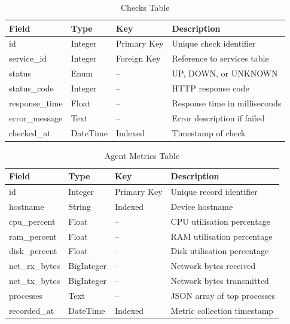 \documentclass[12pt,a4paper,oneside]{report}
\begin{document}
\begin{table}[H]
\centering
\begin{tabularx}{\textwidth}{|l|l|l|X|}
\hline
\textbf{Field} & \textbf{Type} & \textbf{Key} & \textbf{Description} \\
\hline
id & Integer & Primary Key & Unique check identifier \\
service\_id & Integer & Foreign Key & Reference to services table \\
status & Enum & -- & UP, DOWN, or UNKNOWN \\
status\_code & Integer & -- & HTTP response code \\
response\_time & Float & -- & Response time in milliseconds \\
error\_message & Text & -- & Error description if failed \\
checked\_at & DateTime & Indexed & Timestamp of check \\
\hline
\end{tabularx}
\caption{Checks Table}
\label{tab:checks}
\end{table}

\begin{table}[H]
\centering
\begin{tabularx}{\textwidth}{|l|l|l|X|}
\hline
\textbf{Field} & \textbf{Type} & \textbf{Key} & \textbf{Description} \\
\hline
id & Integer & Primary Key & Unique record identifier \\
hostname & String & Indexed & Device hostname \\
cpu\_percent & Float & -- & CPU utilisation percentage \\
ram\_percent & Float & -- & RAM utilisation percentage \\
disk\_percent & Float & -- & Disk utilisation percentage \\
net\_rx\_bytes & BigInteger & -- & Network bytes received \\
net\_tx\_bytes & BigInteger & -- & Network bytes transmitted \\
processes & Text & -- & JSON array of top processes \\
recorded\_at & DateTime & Indexed & Metric collection timestamp \\
\hline
\end{tabularx}
\caption{Agent Metrics Table}
\label{tab:agent}
\end{table}
\end{document}
